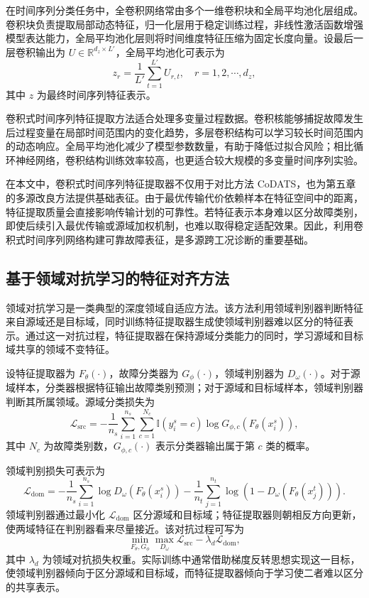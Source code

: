 \documentclass{seuthesis-2022}
\begin{document}
在时间序列分类任务中，全卷积网络常由多个一维卷积块和全局平均池化层组成\cite{wang2017time,fawaz2019deep}。卷积块负责提取局部动态特征，归一化层用于稳定训练过程，非线性激活函数增强模型表达能力，全局平均池化层则将时间维度特征压缩为固定长度向量。设最后一层卷积输出为 $U \in \mathbb{R}^{d_z \times L'}$，全局平均池化可表示为
\begin{equation}
    z_r
    =
    \frac{1}{L'}
    \sum_{t=1}^{L'}
    U_{r,t},
    \quad r=1,2,\cdots,d_z,
\end{equation}
其中 $z$ 为最终时间序列特征表示。

卷积式时间序列特征提取方法适合处理多变量过程数据。卷积核能够捕捉故障发生后过程变量在局部时间范围内的变化趋势，多层卷积结构可以学习较长时间范围内的动态响应。全局平均池化减少了模型参数数量，有助于降低过拟合风险；相比循环神经网络，卷积结构训练效率较高，也更适合较大规模的多变量时间序列实验。

在本文中，卷积式时间序列特征提取器不仅用于对比方法 CoDATS，也为第五章的多源改良方法提供基础表征。由于最优传输代价依赖样本在特征空间中的距离，特征提取质量会直接影响传输计划的可靠性。若特征表示本身难以区分故障类别，即使后续引入最优传输或源域加权机制，也难以取得稳定适配效果。因此，利用卷积式时间序列网络构建可靠故障表征，是多源跨工况诊断的重要基础。

\subsection{基于领域对抗学习的特征对齐方法}

领域对抗学习是一类典型的深度领域自适应方法。该方法利用领域判别器判断特征来自源域还是目标域，同时训练特征提取器生成使领域判别器难以区分的特征表示。通过这一对抗过程，特征提取器在保持源域分类能力的同时，学习源域和目标域共享的领域不变特征\cite{ganin2016dann}。

设特征提取器为 $F_\theta(\cdot)$，故障分类器为 $G_\phi(\cdot)$，领域判别器为 $D_\omega(\cdot)$。对于源域样本，分类器根据特征输出故障类别预测；对于源域和目标域样本，领域判别器判断其所属领域。源域分类损失为
\begin{equation}
    \mathcal{L}_{\mathrm{src}}
    =
    -\frac{1}{n_s}
    \sum_{i=1}^{n_s}
    \sum_{c=1}^{N_c}
    \mathbb{I}(y_i^s=c)
    \log G_{\phi,c}(F_\theta(x_i^s)),
\end{equation}
其中 $N_c$ 为故障类别数，$G_{\phi,c}(\cdot)$ 表示分类器输出属于第 $c$ 类的概率。

领域判别损失可表示为
\begin{equation}
    \mathcal{L}_{\mathrm{dom}}
    =
    -\frac{1}{n_s}
    \sum_{i=1}^{n_s}
    \log D_\omega(F_\theta(x_i^s))
    -
    \frac{1}{n_t}
    \sum_{j=1}^{n_t}
    \log \left(1-D_\omega(F_\theta(x_j^t))\right).
\end{equation}
领域判别器通过最小化 $\mathcal{L}_{\mathrm{dom}}$ 区分源域和目标域；特征提取器则朝相反方向更新，使两域特征在判别器看来尽量接近。该对抗过程可写为
\begin{equation}
    \min_{F_\theta,G_\phi}
    \max_{D_\omega}
    \mathcal{L}_{\mathrm{src}}
    -
    \lambda_d \mathcal{L}_{\mathrm{dom}},
\end{equation}
其中 $\lambda_d$ 为领域对抗损失权重。实际训练中通常借助梯度反转思想实现这一目标，使领域判别器倾向于区分源域和目标域，而特征提取器倾向于学习使二者难以区分的共享表示。
\end{document}
